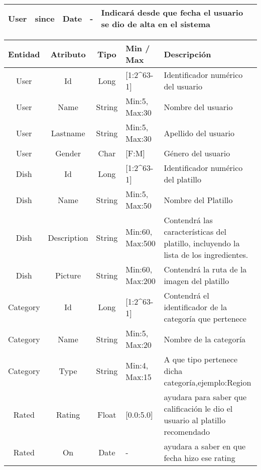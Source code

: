 \begin{landscape}
\begin{table}[h]
\begin{center}
\begin{tabular}{| c | c | c | p{3cm} | p{12cm}|}
        \midrule
        User & since  & Date & - & Indicará desde que fecha el usuario se dio de alta en el sistema \\
        \bottomrule
      \end{tabular}
    \end{center}
  \end{table}
 \newpage
  \begin{table}
    \begin{center}
      \begin{tabular}{| c | c | c | p{3cm} | p{12cm}|} 
        \toprule
        Entidad & Atributo & Tipo & Min / Max & Descripción\\
        \midrule
        User & Id  & Long & [1:2\^{ }63-1] & Identificador numérico del usuario\\
        \midrule
        User & Name  & String & Min:5, Max:30  & Nombre del usuario \\
        \midrule
        User & Lastname  & String & Min:5, Max:30 & Apellido del usuario \\
        \midrule
        User & Gender  & Char & [F:M]  & Género del usuario \\
        \midrule
        Dish & Id & Long & [1:2\^{ }63-1] & Identificador numérico del platillo\\
        \midrule
        Dish & Name  & String & Min:5, Max:50  & Nombre del Platillo \\
        \midrule
        Dish & Description & String & Min:60, Max:500  & Contendrá las características del platillo, incluyendo la lista de los ingredientes. \\
        \midrule
        Dish & Picture  & String & Min:60, Max:200 & Contendrá la ruta de la imagen del platillo \\
        \midrule
        Category & Id & Long & [1:2\^{ }63-1] & Contendrá el identificador de la categoría que pertenece \\
        \midrule
       	Category & Name  & String & Min:5, Max:20  & Nombre de la categoría \\
        \midrule
        Category & Type  & String & Min:4, Max:15  & A que tipo pertenece dicha categoría,ejemplo:Region \\
        \midrule
        Rated & Rating  & Float & [0.0:5.0]  & ayudara para saber que calificación le dio el usuario 			al platillo recomendado  \\
        \midrule
        Rated & On  & Date & -  & ayudara a saber en que fecha hizo ese rating \\

\end{tabular}
\end{center}
\end{table}
\end{landscape}
